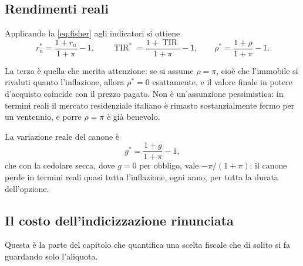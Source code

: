 \documentclass[11pt,a4paper]{article}
\theoremstyle{definition}
\theoremstyle{plain}
\DeclareMathOperator{\TIR}{TIR}
\begin{document}
\subsection{Rendimenti reali}

Applicando la \eqref{eq:fisher} agli indicatori si ottiene
\begin{equation}
r_n^* = \frac{1+r_n}{1+\pi}-1,
\qquad
\TIR^* = \frac{1+\TIR}{1+\pi}-1,
\qquad
\rho^* = \frac{1+\rho}{1+\pi}-1 .
\label{eq:reali}
\end{equation}

La terza è quella che merita attenzione: se si assume $\rho = \pi$, cioè che l'immobile si rivaluti quanto l'inflazione, allora $\rho^*=0$ esattamente, e il valore finale in potere d'acquisto coincide con il prezzo pagato. Non è un'assunzione pessimistica: in termini reali il mercato residenziale italiano è rimasto sostanzialmente fermo per un ventennio, e porre $\rho=\pi$ è già benevolo.

La variazione reale del canone è
\begin{equation}
g^* = \frac{1+g}{1+\pi}-1,
\label{eq:canone-reale}
\end{equation}
che con la cedolare secca, dove $g=0$ per obbligo, vale $-\pi/(1+\pi)$: il canone perde in termini reali quasi tutta l'inflazione, ogni anno, per tutta la durata dell'opzione.

\subsection{Il costo dell'indicizzazione rinunciata}

Questa è la parte del capitolo che quantifica una scelta fiscale che di solito si fa guardando solo l'aliquota.
\end{document}

